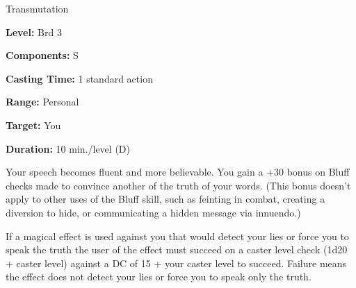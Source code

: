 
Transmutation

\textbf{Level:} Brd 3

\textbf{Components:} S

\textbf{Casting Time:} 1 standard action

\textbf{Range:} Personal

\textbf{Target:} You

\textbf{Duration:} 10 min./level (D)

Your speech becomes fluent and more believable. You gain a +30 bonus on Bluff checks 
made to convince another of the truth of your words. (This bonus doesn't apply 
to other uses of the Bluff skill, such as feinting in combat, creating a diversion 
to hide, or communicating a hidden message via innuendo.)

If a magical effect is used against you that would detect your lies or force you 
to speak the truth the user of the effect must succeed on a caster level check 
(1d20 + caster level) against a DC of 15 + your caster level to succeed. Failure 
means the effect does not detect your lies or force you to speak only the truth.

